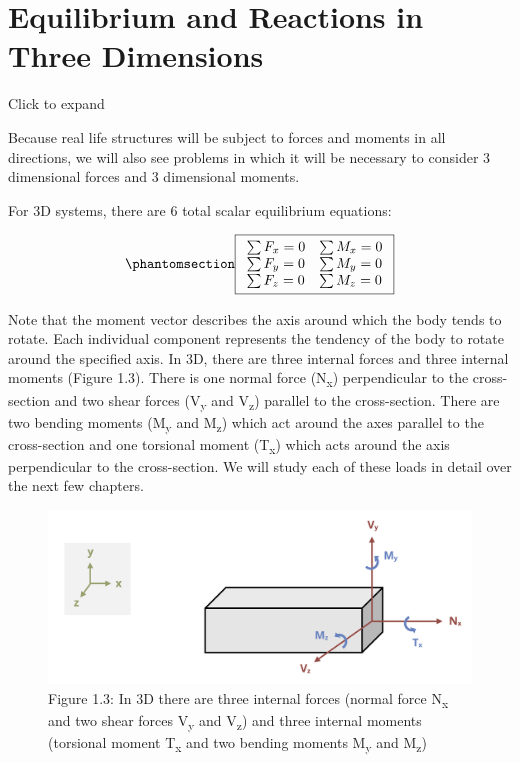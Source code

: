 \documentclass[
  letterpaper,
  DIV=11,
  numbers=noendperiod]{scrreprt}
\theoremstyle{definition}
\theoremstyle{remark}
\begin{document}
\section{Equilibrium and Reactions in Three Dimensions}\label{sec-1.3}

Click to expand

Because real life structures will be subject to forces and moments in
all directions, we will also see problems in which it will be necessary
to consider 3 dimensional forces and 3 dimensional moments.

For 3D systems, there are 6 total scalar equilibrium equations:

\begin{equation}\phantomsection\label{eq-1.2}{
\boxed{\begin{array}{ll}
\sum F_x=0 & \sum M_x=0 \\
\sum F_y=0 & \sum M_y=0 \\
\sum F_z=0 & \sum M_z=0
\end{array}}
}\end{equation}

Note that the moment vector describes the axis around which the body
tends to rotate. Each individual component represents the tendency of
the body to rotate around the specified axis. In 3D, there are three
internal forces and three internal moments (Figure 1.3). There is one
normal force (N\textsubscript{x}) perpendicular to the cross-section and
two shear forces (V\textsubscript{y} and V\textsubscript{z}) parallel to
the cross-section. There are two bending moments (M\textsubscript{y} and
M\textsubscript{z}) which act around the axes parallel to the
cross-section and one torsional moment (T\textsubscript{x}) which acts
around the axis perpendicular to the cross-section. We will study each
of these loads in detail over the next few chapters.

\begin{figure}[H]

{\centering \includegraphics[width=5.3125in,height=\textheight]{images/CH1 PNGs/figure 1.3.png}

}

\caption{Figure 1.3: In 3D there are three internal forces (normal force
N\textsubscript{x} and two shear forces V\textsubscript{y} and
V\textsubscript{z}) and three internal moments (torsional moment
T\textsubscript{x} and two bending moments M\textsubscript{y} and
M\textsubscript{z})}

\end{figure}%
\end{document}
